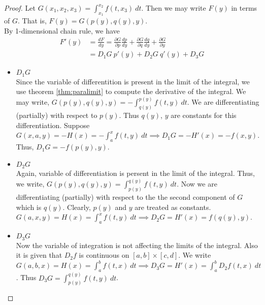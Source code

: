 \begin{proof}
	Let $G(x_1,x_2,x_3) = \int_{x_1}^{x_2} f(t,x_3)\ dt$.
	Then we may write $F(y)$ in terms of $G$.
	That is, $F(y) = G(p(y),q(y),y)$.\\

	By 1-dimensional chain rule, we have 
	\begin{align*}
		F'(y) & = \frac{dF}{dy} = \frac{\partial G}{\partial p} \frac{dp}{dy} + \frac{\partial G}{\partial q} \frac{dq}{dy} + \frac{\partial G}{\partial y} \\
		& = D_1 G\ p'(y) + D_2 G\ q'(y) + D_3 G
	\end{align*}

	\begin{itemize}
		\item $D_1 G$ \\
			Since the variable of differentition is present in the limit of the integral, we use theorem \ref{thm:paralimit} to compute the derivative of the integral.
			We may write, $G(p(y),q(y),y)  = -\int_{q(y)}^{p(y)} f(t,y)\ dt$.
			We are differentiating (partially) with respect to $p(y)$.
			Thus $q(y)$, $y$ are constants for this differentiation.
			Suppose $G(x,a,y) = -H(x) = -\int_a^x f(t,y)\ dt \implies D_1 G = -H'(x)= -f(x,y)$.
			Thus, $D_1 G = -f(p(y),y)$.
		\item $D_2 G$ \\
			Again, variable of differentiation is persent in the limit of the integral.
			Thus, we write, $G(p(y),q(y),y) = \int_{p(y)}^{q(y)} f(t,y)\ dt$.
			Now we are differentiating (partially) with respect to the the second component of $G$ which is $q(y)$.
			Clearly, $p(y)$ and $y$ are treated as constants.
			$G(a,x,y) = H(x) = \int_a^x f(t,y)\ dt \implies D_2 G = H'(x) = f(q(y),y)$.
		\item $D_3 G$ \\
			Now the variable of integration is not affecting the limits of the integral.
			Also it is given that $D_2 f$ is continuous on $[a,b] \times [c,d]$.
			We write $G(a,b,x) = H(x) = \int_a^b f(t,x)\ dt \implies D_3 G = H'(x) = \int_a^b D_2 f(t,x)\ dt$.
			Thus $D_3 G = \int_{p(y)}^{q(y)} f(t,y)\ dt$.
	\end{itemize}
\end{proof}

